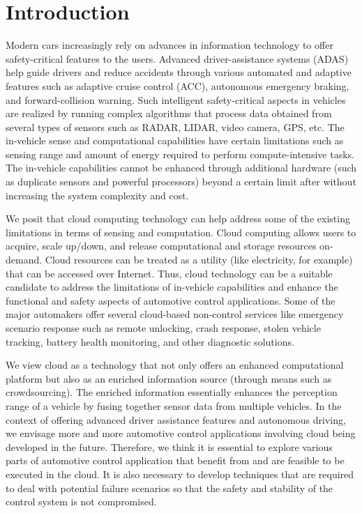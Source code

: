 \section{Introduction}
\label{sec:Introd.date17}
Modern cars increasingly rely on advances in information technology to offer safety-critical features to the users. Advanced driver-assistance systems (ADAS) help guide drivers and reduce accidents through various automated and adaptive features such as adaptive cruise control (ACC), autonomous emergency braking, and forward-collision warning. Such intelligent safety-critical aspects in vehicles are realized by running complex algorithms that process data obtained from several types of sensors such as RADAR, LIDAR, video camera, GPS, etc. The in-vehicle sense and computational capabilities have certain limitations such as sensing range and amount of energy required to perform compute-intensive tasks. The in-vehicle capabilities cannot be enhanced through additional hardware (such as duplicate sensors and powerful processors) beyond a certain limit after without increasing the system complexity and cost.

We posit that cloud computing technology can help address some of the existing limitations in terms of sensing and computation. Cloud computing allows users to acquire, scale up/down, and release computational and storage resources on-demand. Cloud resources can be treated as a utility (like electricity, for example) that can be accessed over Internet. Thus, cloud technology can be a suitable candidate to address the limitations of in-vehicle capabilities and enhance the functional and safety aspects of automotive control applications. Some of the major automakers offer several cloud-based non-control services like emergency scenario response such as remote unlocking, crash response, stolen vehicle tracking, battery health monitoring, and other diagnostic solutions.

We view cloud as a technology that not only offers an enhanced computational platform but also as an enriched information source (through means such as crowdsourcing). The enriched information essentially enhances the perception range of a vehicle by fusing together sensor data from multiple vehicles. In the context of offering advanced driver assistance features and autonomous driving, we envisage more and more automotive control applications involving cloud being developed in the future. Therefore, we think it is essential to explore various parts of automotive control application that benefit from and are feasible to be executed in the cloud. It is also necessary to develop techniques that are required to deal with potential failure scenarios so that the safety and stability of the control system is not compromised.

